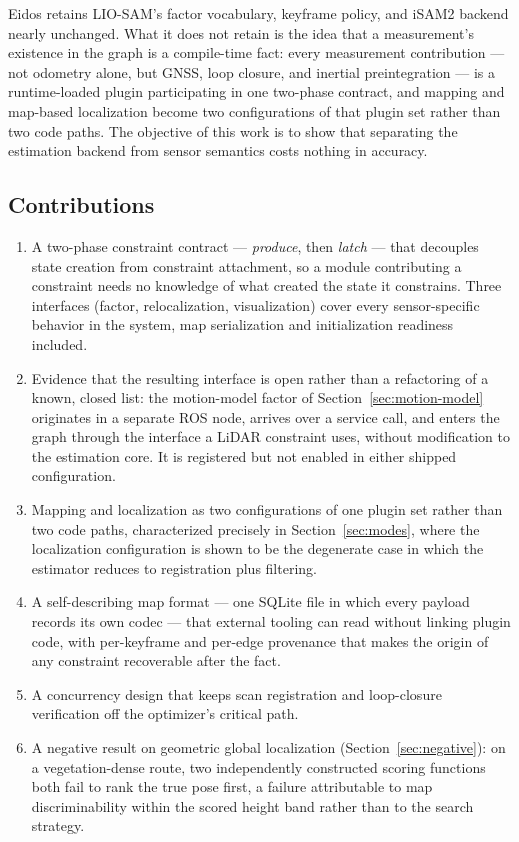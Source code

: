 \documentclass[conference]{IEEEtran}
\begin{document}
Eidos retains LIO-SAM's factor vocabulary, keyframe policy, and iSAM2 backend nearly unchanged. What it does not retain is the idea that a measurement's existence in the graph is a compile-time fact: every measurement contribution --- not odometry alone, but GNSS, loop closure, and inertial preintegration --- is a runtime-loaded plugin participating in one two-phase contract, and mapping and map-based localization become two configurations of that plugin set rather than two code paths. The objective of this work is to show that separating the estimation backend from sensor semantics costs nothing in accuracy.

\subsection{Contributions}
\begin{enumerate}
    \item A two-phase constraint contract --- \emph{produce}, then \emph{latch} --- that decouples state creation from constraint attachment, so a module contributing a constraint needs no knowledge of what created the state it constrains. Three interfaces (factor, relocalization, visualization) cover every sensor-specific behavior in the system, map serialization and initialization readiness included.
    \item Evidence that the resulting interface is open rather than a refactoring of a known, closed list: the motion-model factor of Section~\ref{sec:motion-model} originates in a separate ROS node, arrives over a service call, and enters the graph through the interface a LiDAR constraint uses, without modification to the estimation core. It is registered but not enabled in either shipped configuration.
    \item Mapping and localization as two configurations of one plugin set rather than two code paths, characterized precisely in Section~\ref{sec:modes}, where the localization configuration is shown to be the degenerate case in which the estimator reduces to registration plus filtering.
    \item A self-describing map format --- one SQLite file in which every payload records its own codec --- that external tooling can read without linking plugin code, with per-keyframe and per-edge provenance that makes the origin of any constraint recoverable after the fact.
    \item A concurrency design that keeps scan registration and loop-closure verification off the optimizer's critical path.
    \item A negative result on geometric global localization (Section~\ref{sec:negative}): on a vegetation-dense route, two independently constructed scoring functions both fail to rank the true pose first, a failure attributable to map discriminability within the scored height band rather than to the search strategy.
\end{enumerate}
\end{document}
